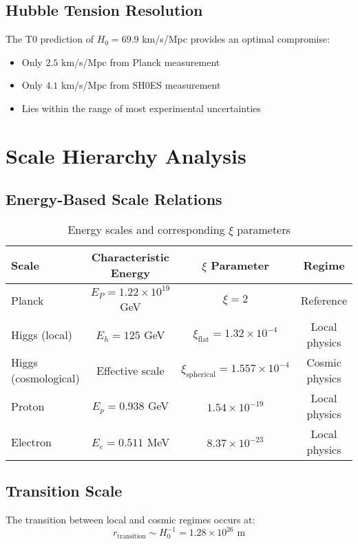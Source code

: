 \documentclass[12pt,a4paper]{article}
\begin{document}
	\subsection{Hubble Tension Resolution}
	The T0 prediction of $H_0 = 69.9$ km/s/Mpc provides an optimal compromise:
	\begin{itemize}
		\item Only $2.5$ km/s/Mpc from Planck measurement
		\item Only $4.1$ km/s/Mpc from SH0ES measurement
		\item Lies within the range of most experimental uncertainties
	\end{itemize}
	
	\section{Scale Hierarchy Analysis}
	
	\subsection{Energy-Based Scale Relations}
	
	\begin{table}[htbp]
		\centering
		\begin{tabular}{lccc}
			\toprule
			\textbf{Scale} & \textbf{Characteristic Energy} & \textbf{$\xi$ Parameter} & \textbf{Regime} \\
			\midrule
			Planck & $E_P = 1.22 \times 10^{19}$ GeV & $\xi = 2$ & Reference \\
			Higgs (local) & $E_h = 125$ GeV & $\xi_{\text{flat}} = 1.32 \times 10^{-4}$ & Local physics \\
			Higgs (cosmological) & Effective scale & $\xi_{\text{spherical}} = 1.557 \times 10^{-4}$ & Cosmic physics \\
			Proton & $E_p = 0.938$ GeV & $1.54 \times 10^{-19}$ & Local physics \\
			Electron & $E_e = 0.511$ MeV & $8.37 \times 10^{-23}$ & Local physics \\
			\bottomrule
		\end{tabular}
		\caption{Energy scales and corresponding $\xi$ parameters}
		\label{tab:energy_scales}
	\end{table}
	
	\subsection{Transition Scale}
	The transition between local and cosmic regimes occurs at:
	\begin{equation}
		r_{\text{transition}} \sim H_0^{-1} = 1.28 \times 10^{26} \text{ m}
	\end{equation}
	
\end{document}
